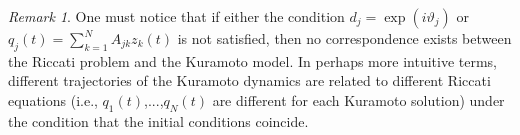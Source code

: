 \documentclass[aps,pre,reprint,longbibliography,superscriptaddress,noshowpacs,floatfix]{revtex4-2}
\newtheorem{lemma}{Lemma}
\theoremstyle{definition}
\theoremstyle{remark}
\newtheorem{remark}[theorem]{Remark}
\begin{document}
\begin{remark}
    One must notice that if either the condition $d_j = \exp(i\vartheta_j)$ or $q_j(t) = \textstyle{\sum_{k=1}^N} A_{jk}z_k(t)$ is not satisfied, then no correspondence exists between the Riccati problem and the Kuramoto model. In perhaps more intuitive terms, different trajectories of the Kuramoto dynamics are related to different Riccati equations (i.e., $q_1(t)$,...,$q_N(t)$ are different for each Kuramoto solution) under the condition that the initial conditions coincide.
\end{remark}
\end{document}

